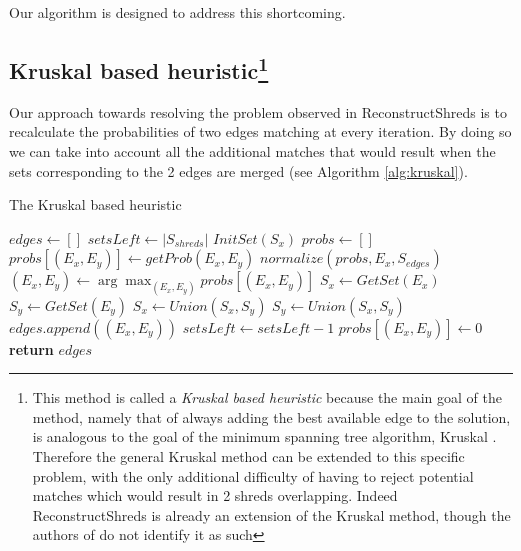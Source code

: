 Our algorithm is designed to address this shortcoming.

\subsection[Kruskal based heuristic] {Kruskal based heuristic\footnote{This method is called a \emph{Kruskal based heuristic} because the main goal of the method, namely that of always adding the best available edge to the solution, is analogous to the goal of the minimum spanning tree algorithm, Kruskal \cite{P9}. Therefore the general Kruskal method can be extended to this specific problem, with the only additional difficulty of having to reject potential matches which would result in 2 shreds overlapping. Indeed ReconstructShreds is already an extension of the Kruskal method, though the authors of \cite{P2} do not identify it as such}} 
Our approach towards resolving the problem observed in ReconstructShreds is to recalculate the probabilities of two edges matching at every iteration. By doing so we can take into account all the additional matches that would result when the sets corresponding to the 2 edges are merged (see Algorithm \ref{alg:kruskal}). 

\begin{algorithm}[h]
\caption{The Kruskal based heuristic}
\begin{algorithmic}[1]
  \State $edges \gets []$ 
  \State $setsLeft \gets |S_{shreds}|$ 
    \State $InitSet(S_x)$
  \EndFor
  \Statex
    \State $probs \gets []$ 
        \State $probs[(E_x,E_y)] \gets getProb(E_x,E_y)$  
      \EndFor
      \State $normalize(probs, E_x, S_{edges})$ 
    \EndFor
    \State $(E_x,E_y) \gets \arg\max_{(E_x,E_y)} probs[(E_x,E_y)]$
    \State $S_x \gets GetSet(E_x)$ 
    \State $S_y \gets GetSet(E_y)$
      \State $S_x \gets Union(S_x,S_y)$ 
      \State $S_y \gets Union(S_x,S_y)$
      \State $edges.append((E_x,E_y))$
      \State $setsLeft \gets setsLeft - 1$  
    \EndIf
    \State $probs[(E_x,E_y)] \gets 0$ 
  \EndWhile
  \Statex
  \State \textbf{return} $edges$ 
\EndProcedure
\end{algorithmic}
\label{alg:kruskal}
\end{algorithm}

